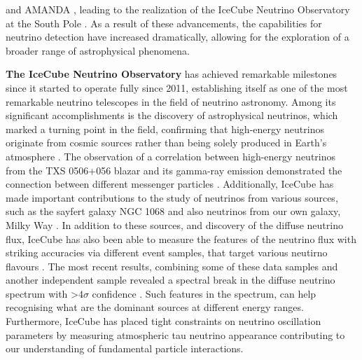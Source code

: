  and AMANDA , leading to the realization of the IceCube Neutrino Observatory at the South Pole . As a result of these advancements, the capabilities for neutrino detection have increased dramatically, allowing for the exploration of a broader range of astrophysical phenomena.

\textbf{The IceCube Neutrino Observatory} has achieved remarkable milestones since it started to operate fully since 2011, establishing itself as one of the most remarkable neutrino telescopes in the field of neutrino astronomy. Among its significant accomplishments is the discovery of astrophysical neutrinos, which marked a turning point in the field, confirming that high-energy neutrinos originate from cosmic sources rather than being solely produced in Earth's atmosphere . The observation of a correlation between high-energy neutrinos from the TXS 0506+056 blazar and its gamma-ray emission demonstrated the connection between different messenger particles . Additionally, IceCube has made important contributions to the study of neutrinos from various sources, such as the sayfert galaxy NGC 1068  and also neutrinos from our own galaxy, Milky Way . In addition to these sources, and discovery of the diffuse neutrino flux, IceCube has also been able to measure the features of the neutrino flux with striking accuracies via different event samples, that target various neutirno flavours . The most recent results, combining some of these data samples and another independent sample revealed a spectral break in the diffuse neutrino spectrum with >$4\sigma$ confidence . Such features in the spectrum, can help recognising what are the dominant sources at different energy ranges. Furthermore, IceCube has placed tight constraints on neutrino oscillation parameters by measuring atmospheric tau neutrino appearance  contributing to our understanding of fundamental particle interactions. 